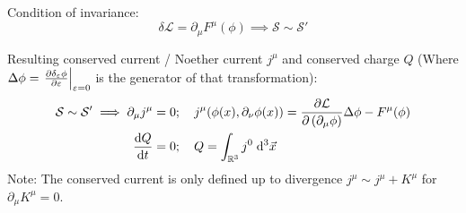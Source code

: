 		\noindent
		Condition of invariance:
		\begin{equation}
			\delta\mathcal{L} = \partial_\mu F^\mu(\phi)
			\implies \mathcal{S} \sim \mathcal{S}'
		\end{equation}

		\noindent
		Resulting conserved current / Noether current $j^{\mu}$ and conserved charge $Q$ (Where $\Delta \phi = \eval{\pdv{\delta_\varepsilon \phi}{\varepsilon}}_{\varepsilon=0}$ is the generator of that transformation):
		\begin{equation}
			\begin{aligned}
				\mathcal{S} \sim \mathcal{S}' \implies
				\partial_\mu j^\mu &= 0;\quad
				j^\mu \qty( \phi(x), \partial_\nu\phi(x) ) = \pdv{\mathcal{L}}{\left(\partial_\mu \phi\right)}\Delta\phi - F^\mu(\phi) \\
				\dv{Q}{t} &= 0; \quad Q = \int_{\mathbb{R}^3} j^0\;\dd^3\vec{x} \\
			\end{aligned}
		\end{equation}
		Note: The conserved current is only defined up to divergence $j^\mu \sim j^\mu + K^\mu$ for $\partial_\mu K^\mu = 0$.